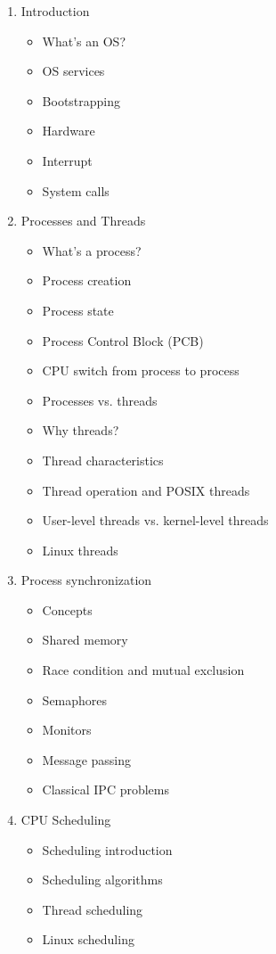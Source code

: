\documentclass{wx672article}
\begin{document}
\begin{enumerate}
\item Introduction
  \begin{itemize}
  \item What's an OS?
  \item OS services
  \item Bootstrapping
  \item Hardware
  \item Interrupt
  \item System calls
  \end{itemize}
\item Processes and Threads
  \begin{itemize}
  \item What's a process?
  \item Process creation
  \item Process state
  \item Process Control Block (PCB)
  \item CPU switch from process to process
  \item Processes vs. threads
  \item Why threads?
  \item Thread characteristics
  \item Thread operation and POSIX threads
  \item User-level threads vs. kernel-level threads
  \item Linux threads
  \end{itemize}
\item Process synchronization
  \begin{itemize}
  \item Concepts
  \item Shared memory
  \item Race condition and mutual exclusion
  \item Semaphores
  \item Monitors
  \item Message passing
  \item Classical IPC problems
  \end{itemize}
\item CPU Scheduling
  \begin{itemize}
  \item Scheduling introduction
  \item Scheduling algorithms
  \item Thread scheduling
  \item Linux scheduling
  \end{itemize}

\end{enumerate}
\end{document}
